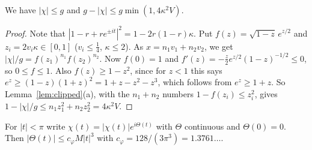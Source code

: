 \begin{lemma}[modulus]\label{lem:llt-modulus}
We have $|\chi|\le g$ and $g-|\chi|\le g\min(1,4\kappa^2V)$.
\end{lemma}

\begin{proof}
Note that $|1-r+re^{\pm it}|^2=1-2r(1-r)\kappa$. Put $f(z)=\sqrt{1-z}\,e^{z/2}$ and
$z_i=2v_i\kappa\in[0,1]$ ($v_i\le\frac14$, $\kappa\le2$). As $x=n_1v_1+n_2v_2$, we get
$|\chi|/g=f(z_1)^{n_1}f(z_2)^{n_2}$. Now $f(0)=1$ and $f'(z)=-\frac z2e^{z/2}(1-z)^{-1/2}\le0$, so
$0\le f\le1$. Also $f(z)\ge1-z^2$, since for $z<1$ this says $e^z\ge(1-z)(1+z)^2=1+z-z^2-z^3$,
which follows from $e^z\ge1+z$. So Lemma~\ref{lem:clipped}(a), with the $n_1+n_2$ numbers
$1-f(z_i)\le z_i^2$, gives $1-|\chi|/g\le n_1z_1^2+n_2z_2^2=4\kappa^2V$.
\end{proof}

\begin{lemma}[phase]\label{lem:llt-phase}
For $|t|<\pi$ write $\chi(t)=|\chi(t)|e^{i\Theta(t)}$ with $\Theta$ continuous and $\Theta(0)=0$.
Then $|\Theta(t)|\le c_\varphi M|t|^3$ with $c_\varphi=128/(3\pi^3)=1.3761\ldots$.
\end{lemma}

